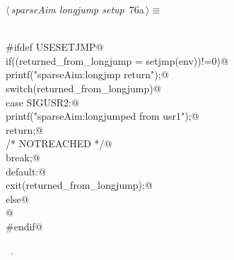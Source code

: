 \documentclass{article}
\begin{document}
\begin{flushleft} \small
\begin{minipage}{\linewidth}\label{scrap113}\raggedright\small
{} $\langle\,${\itshape sparseAim longjump setup}\nobreak\ {\footnotesize {76a}}$\,\rangle\equiv$
\vspace{-1ex}
\begin{list}{}{} \item
\mbox{}\verb@@\\
\mbox{}\verb@#ifdef USESETJMP@\\
\mbox{}\verb@  if((returned_from_longjump = setjmp(env))!=0){@\\
\mbox{}\verb@        printf("sparseAim:longjmp return\n");@\\
\mbox{}\verb@        switch(returned_from_longjump){@\\
\mbox{}\verb@  case SIGUSR2:@\\
\mbox{}\verb@        printf("sparseAim:longjumped from usr1\n");@\\
\mbox{}\verb@        return;@\\
\mbox{}\verb@/* NOTREACHED */@\\
\mbox{}\verb@        break;@\\
\mbox{}\verb@  default:@\\
\mbox{}\verb@        exit(returned_from_longjump);@\\
\mbox{}\verb@        }} else@\\
\mbox{}@\\
\mbox{}\verb@#endif@\\
\mbox{}\verb@@{\NWsep}
\end{list}
\vspace{-1.5ex}
\footnotesize
\begin{list}{}{\setlength{\itemsep}{-\parsep}\setlength{\itemindent}{-\leftmargin}}
\item \NWtxtMacroRefIn\ .

\item{}
\end{list}
\end{minipage}\vspace{4ex}
\end{flushleft}
\end{document}
